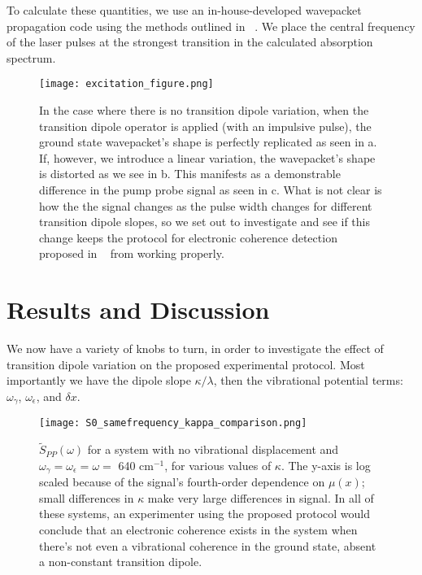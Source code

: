 To calculate these quantities, we use an in-house-developed wavepacket propagation code using the methods outlined in ~\cite{Mukamel1995,UFSwavepackets,Tannor2007,technique}.  We place the central frequency of the laser pulses at the strongest transition in the calculated absorption spectrum.

\begin{figure}
   \texttt{[image: excitation\_figure.png]}
   \caption{In the case where there is no transition dipole variation, when the transition dipole operator is applied (with an impulsive pulse), the ground state wavepacket's shape is perfectly replicated as seen in a.  If, however, we introduce a linear variation, the wavepacket's shape is distorted as we see in b.  This manifests as a demonstrable difference in the pump probe signal as seen in c.  What is not clear is how the the signal changes as the pulse width changes for different transition dipole slopes, so we set out to investigate and see if this change keeps the protocol for electronic coherence detection proposed in ~\cite{witness,allanWitness} from working properly.  }
	\label{fig:physicalIllustration}
\end{figure}


\section{Results and Discussion}

We now have a variety of knobs to turn, in order to investigate the effect of transition dipole variation on the proposed experimental protocol.  Most importantly we have the dipole slope $\kappa/\lambda$, then the vibrational potential terms:  $\omega_{\gamma}$, $\omega_{\epsilon}$, and $\delta x$.



\begin{figure}
   \texttt{[image: S0\_samefrequency\_kappa\_comparison.png]}
   \caption{$\tilde{S}_{PP} ( \omega)$ for a system with no vibrational displacement and $\omega_{\gamma} = \omega_{\epsilon} = \omega = $ 640 cm$^{-1}$, for various values of $\kappa$.  The y-axis is log scaled because of the signal's fourth-order dependence on $\mu(x)$; small differences in $\kappa$ make very large differences in signal.  In all of these systems, an experimenter using the proposed protocol would conclude that an electronic coherence exists in the system when there's not even a vibrational coherence in the ground state, absent a non-constant transition dipole.}
	\label{fig:tunedZero}
\end{figure}



